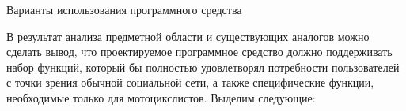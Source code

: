 
\subsubsection{} Варианты использования программного средства
\label{sec:domain:model:use_cases}

В результат анализа предметной области и существующих аналогов можно сделать вывод, что проектируемое программное средство должно поддерживать набор функций, который бы полностью удовлетворял потребности пользователей с точки зрения обычной социальной сети, а также специфические функции, необходимые только для мотоцикслистов. Выделим следующие:

